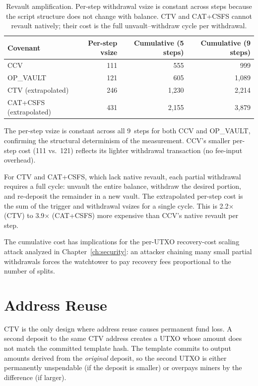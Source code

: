 \begin{table}[t]
\centering
\caption{Revault amplification. Per-step withdrawal vsize is constant across steps
because the script structure does not change with balance. CTV and CAT+CSFS cannot
revault natively; their cost is the full unvault--withdraw cycle per withdrawal.}
\label{tab:revault}
\begin{tabular}{@{}lrrr@{}}
\toprule
Covenant & Per-step vsize & Cumulative (5 steps) & Cumulative (9 steps) \\
\midrule
CCV       & 111\vB{} & 555\vB{} & 999\vB{} \\
OP\_VAULT & 121\vB{} & 605\vB{} & 1{,}089\vB{} \\
\midrule
CTV (extrapolated)      & 246\vB{} & 1{,}230\vB{} & 2{,}214\vB{} \\
CAT+CSFS (extrapolated) & 431\vB{} & 2{,}155\vB{} & 3{,}879\vB{} \\
\bottomrule
\end{tabular}
\end{table}

The per-step vsize is constant across all 9~steps for both CCV and OP\_VAULT, confirming
the structural determinism of the measurement. CCV's smaller per-step cost (111\vB{}
vs.\ 121\vB{}) reflects its lighter withdrawal transaction (no fee-input overhead).

For CTV and CAT+CSFS, which lack native revault, each partial withdrawal requires a
full cycle: unvault the entire balance, withdraw the desired portion, and re-deposit
the remainder in a new vault. The extrapolated per-step cost is the sum of the trigger
and withdrawal vsizes for a single cycle. This is 2.2$\times$ (CTV) to 3.9$\times$
(CAT+CSFS) more expensive than CCV's native revault per step.

The cumulative cost has implications for the per-UTXO recovery-cost scaling attack analyzed in
Chapter~\ref{ch:security}: an attacker chaining many small partial withdrawals forces
the watchtower to pay recovery fees proportional to the number of splits.

\section{Address Reuse} \label{se:address_reuse_results}

CTV is the only design where address reuse causes permanent fund loss. A second deposit
to the same CTV address creates a UTXO whose amount does not match the committed
template hash. The template commits to output amounts derived from the \emph{original}
deposit, so the second UTXO is either permanently unspendable (if the deposit is
smaller) or overpays miners by the difference (if larger).

